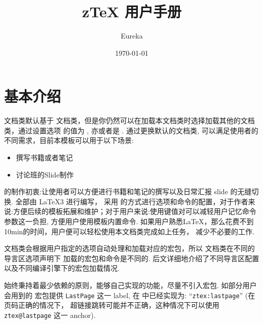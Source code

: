 \documentclass[
  lang=cn, 
  hyper=true,
  class=l3dox, 
]{../code/ztex}
\title{\texorpdfstring{\vspace{-4pt}z\TeX{} 用户手册}{zTeX 用户手册}}
\author{Eureka}
\date{\today}
\begin{document}
\let\zthmlang\Ozthmlang
\let\zthmnameset\Ozthmnameset
\let\zthmnew\Ozthmnew
\let\zthmstyle\Ozthmstyle
\let\zaliasopset\Ozaliasopset
\let\zthmtitleformat\Ozthmtitleformat
\let\zthmtitlebefore\Ozthmtitlebefore
\let\zthmbefore\Ozthmbefore
\let\zthmcolorset\Ozthmcolorset
\let\zthmiconset\Ozthmiconset
{}
  \maketitle
\restoregeometry
{}
  \ztexslideTF{
    \thispagestyle{empty}
    \tableofcontents
  }{
    \thispagestyle{empty}
    \vspace*{-3em}
    \tableofcontents
    \clearpage
  }
\restoregeometry


\fancyheadoffset{0pt}


\section{基本介绍}
\ztex{} 文档类默认基于  文档类，但是你仍然可以在加载本文档类时选择加载其他的文档类，通过设置选项  的值为 
,  亦或者是 . 通过更换默认的文档类, \zTeX{} 可以满足使用者的不同需求，目前本模板可以用于以下场景:
\begin{itemize}
  \item 撰写书籍或者笔记
  \item 讨论班的Slide制作%
\end{itemize}

\ztex{} 的制作初衷:让使用者可以方便进行书籍和笔记的撰写以及日常汇报 slide 的无缝切换. \ztex{} 全部由 \LaTeX3 进行编写，
采用  的方式进行选项和命令的配置，对于作者来说:方便后续的模板拓展和维护；对于用户来说:使用键值对可以减轻用户记忆命令
参数这一负担, 方便用户使用模板内置命令. 如果用户熟悉\LaTeX{}，那么花费不到10min的时间，用户便可以轻松使用本文档类完成如上任务，
减少不必要的工作.

\ztex{} 文档类会根据用户指定的选项自动处理和加载对应的宏包，所以 \ztex{} 文档类在不同的导言区选项声明下
加载的宏包和命令是不同的. 后文详细地介绍了不同导言区配置以及不同编译引擎下的宏包加载情况. 

\ztex{} 始终秉持着最少依赖的原则，能够自己实现的功能，尽量不引入宏包. 如部分用户会用到的  宏包提供
\texttt{LastPage} 这一 label, 在 \zTeX{} 中已经实现为: ``\texttt{ztex:lastpage}'' (在页码正确的情况下，
超链接跳转可能并不正确，这种情况下可以使用 \texttt{ztex@lastpage} 这一 anchor).
\end{document}
